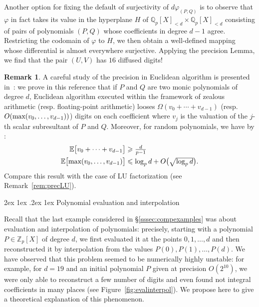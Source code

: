 \documentclass[11pt]{article}
\makeatletter
\numberwithin{equation}{section}
\numberwithin{figure}{section}
\renewcommand\paragraph{\@startsection{paragraph}{4}{\z@}%
                                    {2ex \@plus1ex \@minus.2ex}%
                                    {1ex}%
                                    {\normalfont\normalsize\bfseries}}
\renewcommand{\leq}{\leqslant}
\renewcommand{\geq}{\geqslant}
\theoremstyle{definition}
\newtheorem{rem}[theo]{Remark}
\newcommand{\Z}{\mathbb Z}
\newcommand{\Zp}{\Z_p}
\newcommand{\Q}{\mathbb Q}
\newcommand{\Qp}{\Q_p}
\newcommand{\E}{\mathbb E}
\renewcommand{\max}{\text{\rm max}}
\makeatother
\begin{document}
Another option for fixing the default of surjectivity of $d 
\varphi_{(P,Q)}$ is to observe that $\varphi$ in fact takes its value in 
the hyperplane $H$ of $\Qp[X]_{< d} \times \Qp[X]_{< d}$ consisting of 
pairs of polynomials $(P,Q)$ whose coefficients in degree $d{-}1$ agree. 
Restricting the codomain of $\varphi$ to $H$, we then obtain a 
well-defined mapping whose differential is almost everywhere surjective. 
Applying the precision Lemma, we find that the pair $(U,V)$ has $16$ 
diffused digits!

\begin{rem}
A careful study of the precision in Euclidean algorithm is presented 
in~\cite{Ca17}: we prove in this reference that if $P$ and $Q$ are two
monic polynomials of degree $d$, Euclidean algorithm executed within the 
framework of zealous arithmetic (resp. floating-point arithmetic) looses 
$\Omega(v_0 + \cdots + v_{d{-}1})$ (resp. $O(\max(v_0, \ldots, 
v_{d{-}1}))$) digits on each coefficient where $v_j$ is the valuation of 
the $j$-th scalar subresultant of $P$ and $Q$. Moreover, for random 
polynomials, we have by \cite[Corollary~3.6]{Ca17}:
\begin{align*}
\E\big[v_0 + \cdots + v_{d{-}1}\big] & 
\textstyle \geq \frac d{p-1} \smallskip \\
\E\big[\max(v_0, \ldots, v_{d{-}1})\big] & 
\textstyle \leq \log_p d + O\big(\sqrt{\log_p d}\big).
\end{align*}
Compare this result with the case of LU factorization
(see Remark~\ref{rem:precLU}).
\end{rem}


\paragraph{Polynomial evaluation and interpolation}

Recall that the last example considered in \S \ref{sssec:compexamples}
was about evaluation and interpolation of polynomials: precisely, 
starting with a polynomial $P \in \Zp[X]$ of degree $d$, we first
evaluated it at the points $0, 1, \ldots, d$ and then reconstructed
it by interpolation from the values $P(0), P(1), \ldots, P(d)$.
We have observed that this problem seemed to be numerically highly 
unstable: for example, for $d = 19$ and an initial polynomial $P$ given 
at precision $O(2^{10})$, we were only able to reconstruct a few
number of digits and even found not integral coefficients in many 
places (see Figure~\ref{fig:evalinterpol}). We propose here to give
a theoretical explanation of this phenomenon.
\end{document}
